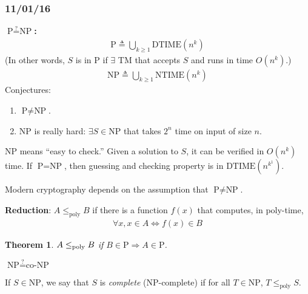 \documentclass[a4paper,12pt]{article}
\newtheorem{theorem}{Theorem}
\theoremstyle{remark}
\theoremstyle{definition}
\begin{document}
\subsubsection*{11/01/16}
\textbf{$\text{P} \overset{?}{=} \text{NP}$:}
\begin{align*}
    \text{P} \triangleq \bigcup_{k \geq 1} \text{DTIME}(n^k)
\end{align*}
(In other words, $S$ is in $\text{P}$ if $\exists$ TM that accepts $S$ and runs in time $O(n^k)$.)
\begin{align*}
    \text{NP} \triangleq \bigcup_{k \geq 1} \text{NTIME}(n^k)
\end{align*}
Conjectures:
\begin{enumerate}
    \item
        $\text{P} \neq \text{NP}$.
    \item
        $\text{NP}$ is really hard: $\exists S \in \text{NP}$ that takes $2^n$ time on input of size $n$.
\end{enumerate}
$\text{NP}$ means ``easy to check.'' Given a solution to $S$, it can be verified in $O(n^k)$ time. If $\text{P} = \text{NP}$, then guessing and checking property is in $\text{DTIME}(n^{k^1})$. \par
Modern cryptography depends on the assumption that $\text{P} \neq \text{NP}$. \par
\textbf{Reduction}: $A \leq_{\text{poly}} B$ if there is a function $f(x)$ that computes, in poly-time,
\begin{align*}
    \forall x, x \in A \Leftrightarrow f(x) \in B
\end{align*}
\begin{theorem}
    $A \leq_{\textnormal{poly}} B$ if $B \in \text{P} \Rightarrow A \in \text{P}$.
\end{theorem}
$\text{NP} \overset{?}{=} \text{co-NP}$ \par
If $S \in \text{NP}$, we say that $S$ is \emph{complete} (NP-complete) if for all $T \in \text{NP}$, $T \leq_{\text{poly}} S$.
\end{document}
